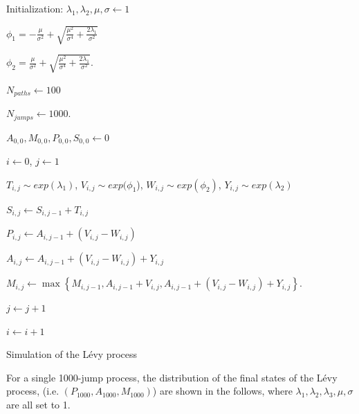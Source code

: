 \begin{algorithm}[H]
\SetAlgoLined
{}
 Initialization:
 $\lambda_1, \lambda_2, \mu, \sigma \leftarrow{} 1$
 
 $\phi_{1}=-\frac{\mu}{\sigma^{2}}+\sqrt{\frac{\mu^{2}}{\sigma^{4}}+\frac{2 \lambda_1}{\sigma^{2}}}$

 $\phi_{2}=\frac{\mu}{\sigma^{2}}+\sqrt{\frac{\mu^{2}}{\sigma^{4}}+\frac{2 \lambda_1}{\sigma^{2}}}$.

 $N_{paths} \leftarrow{} 100$
 
 $N_{jumps} \leftarrow{} 1000$. 
 
 $A_{0,0},M_{0,0},P_{0,0}, S_{0,0}\xleftarrow{}0$
 
 $i \leftarrow{0}$, $j\leftarrow{1}$
 
 {
  {
   $T_{i,j} \sim exp(\lambda_1)$, $V_{i,j} \sim exp(\phi_1$), $W_{i,j} \sim exp(\phi_2)$, $Y_{i,j} \sim exp(\lambda_2)$
  
  $S_{i,j}\leftarrow{}S_{i,j-1}+T_{i,j}$
  
  $P_{i,j}\leftarrow{}A_{i,j-1}+\left(V_{i,j}-W_{i,j}\right)$
  
  $A_{i,j}\leftarrow{}A_{i,j-1}+\left(V_{i,j}-W_{i,j}\right)+Y_{i,j}$
  
  $M_{i,j}\leftarrow{}\max \left\{M_{i,j-1}, A_{i,j-1}+V_{i,j}, A_{i,j-1}+\left(V_{i,j}-W_{i,j}\right)+Y_{i,j}\right\}$.
  
  $j \leftarrow{j + 1}$
  
  }
  
  $i \leftarrow{i + 1}$
  
 }
 \caption{Simulation of the Lévy process}
\end{algorithm}



For a single 1000-jump process, the distribution of the final states of the Lévy process, (i.e. $\left(P_{1000}, A_{1000}, M_{1000}\right)$) are shown in the follows, where $\lambda_1, \lambda_2, \lambda_3, \mu, \sigma$ are all set to 1.

